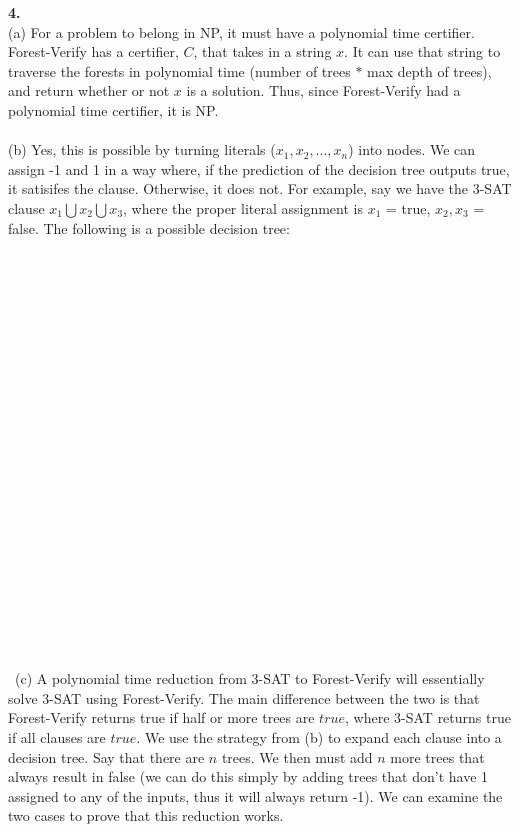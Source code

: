 \documentclass[10pt, letterpaper]{report}
\begin{document}
\newpage
\noindent \large{\textbf{4.} } \\
(a) For a problem to belong in NP, it must have a polynomial time certifier. Forest-Verify has a certifier, $C$, that takes in a string $x$. It can use that string to traverse the forests in polynomial time (number of trees $*$ max depth of trees), and return whether or not $x$ is a solution. Thus, since Forest-Verify had a polynomial time certifier, it is NP. \\
\\
(b) Yes, this is possible by turning literals (\(x_1, x_2, ... , x_n\)) into nodes. We can assign -1 and 1 in a way where, if the prediction of the decision tree outputs true, it satisifes the clause. Otherwise, it does not. For example, say we have the 3-SAT clause \(x_1 \bigcup x_2 \bigcup x_3\), where the proper literal assignment is $x_1$ = true, $x_2, x_3$ = false. The following is a possible decision tree:\\
\\\\\\\\\\\\\\\\\\\\\\\\\\\\\\\\\\\\\\\\\\\\\
(c) 
 A polynomial time reduction from 3-SAT to Forest-Verify will essentially solve 3-SAT using Forest-Verify. The main difference between the two is that Forest-Verify returns true if half or more trees are $true$, where 3-SAT returns true if all clauses are $true$. We use the strategy from (b) to expand each clause into a decision tree. Say that there are $n$ trees. We then must add $n$ more trees that always result in false (we can do this simply by adding trees that don't have 1 assigned to any of the inputs, thus it will always return -1). We can examine the two cases to prove that this reduction works.\\
\\
\end{document}
